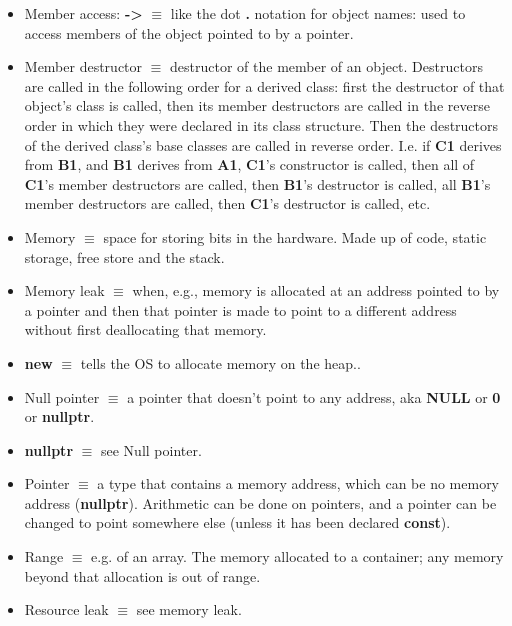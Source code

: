 \documentclass[12pt]{article}
\begin{document}
\begin{itemize}
\item Member access: \textbf{->} $\equiv$ like the dot \textbf{.} notation for object names: used to access members of the object pointed to by a pointer.

\item Member destructor $\equiv$ destructor of the member of an object. Destructors are called in the following order for a derived class: first the destructor of that object's class is called, then its member destructors are called in the reverse order in which they were declared in its class structure. Then the destructors of the derived class's base classes are called in reverse order. I.e. if \textbf{C1} derives from \textbf{B1}, and \textbf{B1} derives from \textbf{A1}, \textbf{C1}'s constructor is called, then all of \textbf{C1}'s member destructors are called, then \textbf{B1}'s destructor is called, all \textbf{B1}'s member destructors are called, then \textbf{C1}'s destructor is called, etc.  

\item Memory $\equiv$ space for storing bits in the hardware. Made up of code, static storage, free store and the stack.

\item Memory leak $\equiv$ when, e.g., memory is allocated at an address pointed to by a pointer and then that pointer is made to point to a different address without first deallocating that memory.

\item \textbf{new} $\equiv$ tells the OS to allocate memory on the heap..

\item Null pointer $\equiv$ a pointer that doesn't point to any address, aka \textbf{NULL} or \textbf{0} or \textbf{nullptr}.

\item \textbf{nullptr} $\equiv$ see Null pointer.

\item Pointer $\equiv$ a type that contains a memory address, which can be no memory address (\textbf{nullptr}). Arithmetic can be done on pointers, and a pointer can be changed to point somewhere else (unless it has been declared \textbf{const}).

\item Range $\equiv$ e.g. of an array. The memory allocated to a container; any memory beyond that allocation is out of range.

\item Resource leak $\equiv$ see memory leak.


\end{itemize}
\end{document}
